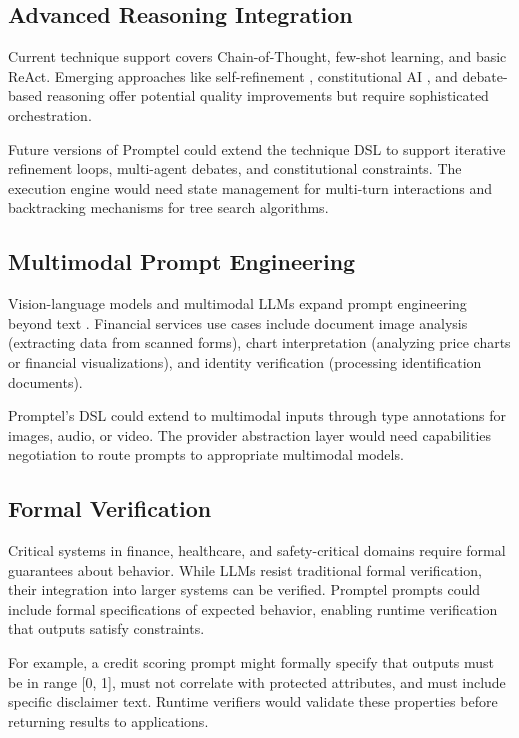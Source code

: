 \documentclass[11pt,a4paper]{article}
\begin{document}
\subsection{Advanced Reasoning Integration}

Current technique support covers Chain-of-Thought, few-shot learning, and basic ReAct. Emerging approaches like self-refinement \cite{madaan2023self}, constitutional AI \cite{bai2022constitutional}, and debate-based reasoning \cite{du2023improving} offer potential quality improvements but require sophisticated orchestration.

Future versions of Promptel could extend the technique DSL to support iterative refinement loops, multi-agent debates, and constitutional constraints. The execution engine would need state management for multi-turn interactions and backtracking mechanisms for tree search algorithms.

\subsection{Multimodal Prompt Engineering}

Vision-language models and multimodal LLMs expand prompt engineering beyond text \cite{radford2021learning}. Financial services use cases include document image analysis (extracting data from scanned forms), chart interpretation (analyzing price charts or financial visualizations), and identity verification (processing identification documents).

Promptel's DSL could extend to multimodal inputs through type annotations for images, audio, or video. The provider abstraction layer would need capabilities negotiation to route prompts to appropriate multimodal models.

\subsection{Formal Verification}

Critical systems in finance, healthcare, and safety-critical domains require formal guarantees about behavior. While LLMs resist traditional formal verification, their integration into larger systems can be verified. Promptel prompts could include formal specifications of expected behavior, enabling runtime verification that outputs satisfy constraints.

For example, a credit scoring prompt might formally specify that outputs must be in range [0, 1], must not correlate with protected attributes, and must include specific disclaimer text. Runtime verifiers would validate these properties before returning results to applications.
\end{document}
